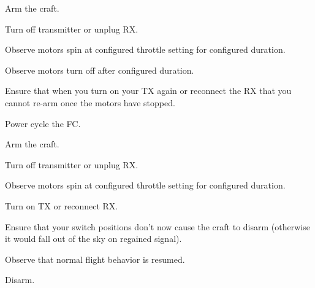 \begin{DoxyEnumerate}
\item Arm the craft.
\end{DoxyEnumerate}
\begin{DoxyEnumerate}
\item Turn off transmitter or unplug R\+X.
\end{DoxyEnumerate}
\begin{DoxyEnumerate}
\item Observe motors spin at configured throttle setting for configured duration.
\end{DoxyEnumerate}
\begin{DoxyEnumerate}
\item Observe motors turn off after configured duration.
\end{DoxyEnumerate}
\begin{DoxyEnumerate}
\item Ensure that when you turn on your T\+X again or reconnect the R\+X that you cannot re-\/arm once the motors have stopped.
\end{DoxyEnumerate}
\begin{DoxyEnumerate}
\item Power cycle the F\+C.
\end{DoxyEnumerate}
\begin{DoxyEnumerate}
\item Arm the craft.
\end{DoxyEnumerate}
\begin{DoxyEnumerate}
\item Turn off transmitter or unplug R\+X.
\end{DoxyEnumerate}
\begin{DoxyEnumerate}
\item Observe motors spin at configured throttle setting for configured duration.
\end{DoxyEnumerate}
\begin{DoxyEnumerate}
\item Turn on T\+X or reconnect R\+X.
\end{DoxyEnumerate}
\begin{DoxyEnumerate}
\item Ensure that your switch positions don't now cause the craft to disarm (otherwise it would fall out of the sky on regained signal).
\end{DoxyEnumerate}
\begin{DoxyEnumerate}
\item Observe that normal flight behavior is resumed.
\end{DoxyEnumerate}
\begin{DoxyEnumerate}
\item Disarm.
\end{DoxyEnumerate}

